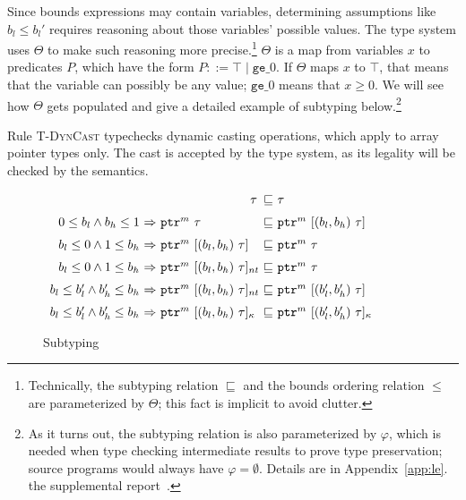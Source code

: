 Since bounds expressions may
contain variables, determining assumptions like $b_l \leq b_l'$
requires reasoning about those variables' possible values. The type
system uses $\Theta$ to make such reasoning more precise.\footnote{Technically, the subtyping relation $\sqsubseteq$ and the bounds
  ordering relation $\leq$ are parameterized by $\Theta$; this fact is
  implicit to avoid clutter.} $\Theta$ is a map from variables $x$ to
predicates $P$, which have the form $P ::= \top \;|\; \texttt{ge}\_0$.
If $\Theta$ maps $x$ to $\top$, that means that the variable can
possibly be any value; $\texttt{ge}\_0$ means that $x \ge 0$. We will
see how $\Theta$ gets populated and give a detailed example of
subtyping below.\footnote{As it turns out, the subtyping relation is
  also parameterized by $\varphi$, which is needed when type checking
  intermediate results to prove type preservation; source programs
  would always have $\varphi = \emptyset$. Details are in
\iftr
  Appendix~\ref{app:le}.
\else
  the supplemental report~\cite{checkedc-tech-report}.
\fi
}

Rule \textsc{T-DynCast} typechecks dynamic casting operations, which
apply to array pointer types only. The cast is accepted by the type
system, as its legality will be checked by the semantics.

\begin{DIFnomarkup}
\begin{figure}
{\small
\begin{center}
  $\begin{array}{r@{~}c@{~}l@{~}c@{~}l}
    &&\multicolumn{1}{r}{\tau} &\sqsubseteq& \tau\\[0.6em]
    0\le b_l \wedge b_h \le 1 &\Rightarrow& \tptr{\tau}{m}&\sqsubseteq& \tarrayptr{b_l}{b_h}{\tau}{m}\\[0.6em]
    b_l \le 0 \wedge 1 \le b_h &\Rightarrow& \tarrayptr{b_l}{b_h}{\tau}{m} &\sqsubseteq& \tptr{\tau}{m}\\[0.6em]
    b_l \le 0 \wedge 1 \le b_h &\Rightarrow& \tntarrayptr{b_l}{b_h}{\tau}{m} &\sqsubseteq& \tptr{\tau}{m}\\[0.6em]
    b_l \le b_l' \wedge b_h' \le b_h &\Rightarrow& \tntarrayptr{b_l}{b_h}{\tau}{m} &\sqsubseteq& \tarrayptr{b_l'}{b_h'}{\tau}{m}\\[0.6em]
    b_l \le b_l' \wedge b_h' \le b_h &\Rightarrow& \tallarrayptr{b_l}{b_h}{\tau}{m} &\sqsubseteq& \tallarrayptr{b_l'}{b_h'}{\tau}{m}
    \end{array}
  $
\end{center}
}
  \caption{Subtyping}
  \label{fig:checkc-subtype}
\end{figure}
\end{DIFnomarkup}

